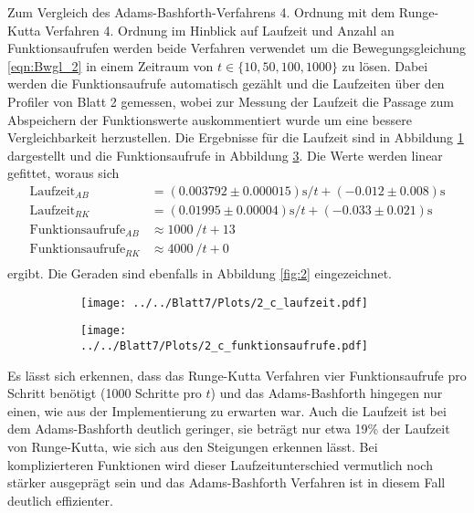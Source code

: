 Zum Vergleich des Adams-Bashforth-Verfahrens 4. Ordnung mit dem Runge-Kutta Verfahren 4. Ordnung im Hinblick auf Laufzeit und Anzahl an Funktionsaufrufen werden beide Verfahren verwendet um die Bewegungsgleichung \eqref{eqn:Bwgl_2} in einem Zeitraum von $t\in\{10,50,100,1000\}$ zu lösen. Dabei werden
die Funktionsaufrufe automatisch gezählt und
die Laufzeiten über den Profiler von Blatt 2 gemessen, wobei zur Messung der Laufzeit die Passage zum Abspeichern der Funktionswerte auskommentiert wurde um eine bessere Vergleichbarkeit herzustellen. Die Ergebnisse
für die Laufzeit sind in Abbildung \ref{fig:2_c_zeit} dargestellt und die Funktionsaufrufe in Abbildung \ref{fig:2_c_aufrufe}. Die Werte werden linear gefittet, woraus sich
\begin{align}
  \text{Laufzeit}_{AB}&=(0.003792 \pm 0.000015)\text{s}/t + (-0.012 \pm 0.008)\text{s} \\
  \text{Laufzeit}_{RK}&= (0.01995 \pm 0.00004)\text{s}/t + (-0.033 \pm 0.021)\text{s} \\
  \text{Funktionsaufrufe}_{AB}&\approx1000 \:/t+ 13 \\
  \text{Funktionsaufrufe}_{RK}&\approx4000 \:/t+ 0 \\
\end{align}
ergibt. Die Geraden sind ebenfalls in Abbildung \ref{fig:2} eingezeichnet.
\begin{figure}[H]
\begin{subfigure}[c]{0.5\textwidth}
\texttt{[image: ../../Blatt7/Plots/2\_c\_laufzeit.pdf]}
\label{fig:2_c_zeit}
\end{subfigure}
\begin{subfigure}[c]{0.5\textwidth}
\texttt{[image: ../../Blatt7/Plots/2\_c\_funktionsaufrufe.pdf]}
\label{fig:2_c_aufrufe}
\end{subfigure}
\end{figure}
Es lässt sich erkennen, dass das Runge-Kutta Verfahren vier Funktionsaufrufe pro Schritt benötigt (1000 Schritte pro $t$) und das Adams-Bashforth hingegen nur einen, wie aus der Implementierung zu erwarten war. Auch die Laufzeit ist bei dem Adams-Bashforth deutlich geringer, sie beträgt nur etwa 19\% der Laufzeit von Runge-Kutta, wie sich aus den Steigungen erkennen lässt. Bei komplizierteren Funktionen wird dieser Laufzeitunterschied vermutlich noch stärker
ausgeprägt sein und das Adams-Bashforth Verfahren ist in diesem Fall deutlich effizienter.
